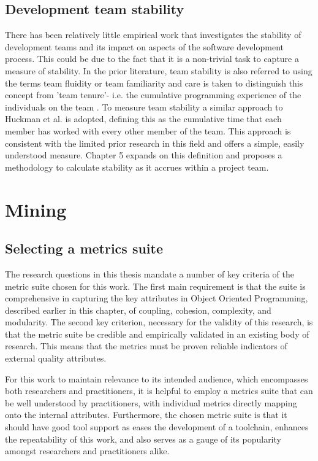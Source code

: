 \subsection{Development team stability}
There has been relatively little empirical work that investigates the stability of development teams and its impact on aspects of the software development process. This could be due to the fact that it is a non-trivial task to capture a measure of stability. In the prior literature, team stability is also referred to using the terms team fluidity or team familiarity \citep{huckman2009team} and care is taken to distinguish this concept from 'team tenure'- i.e. the cumulative programming experience of the individuals on the team \citep{hackman2002leading}. To measure team stability a similar approach to Huckman et al. \citep{huckman2009team} is adopted, defining this as the cumulative time that each member has worked with every other member of the team. This approach is consistent with the limited prior research in this field and offers a simple, easily understood measure. Chapter 5 expands on this definition and proposes a methodology to calculate stability as it accrues within a project team.
	
\section{Mining} %

\subsection{Selecting a metrics suite}
The research questions in this thesis mandate a number of key criteria of the metric suite chosen for this work. The first main requirement is that the suite is comprehensive in capturing the key attributes in Object Oriented Programming, described earlier in this chapter, of coupling, cohesion, complexity, and modularity. The second key criterion, necessary for the validity of this research, is that the metric suite be credible and empirically validated in an existing body of research. This means that the metrics must be proven reliable indicators of external quality attributes.

For this work to maintain relevance to its intended audience, which encompasses both researchers and practitioners, it is helpful to employ a metrics suite that can be well understood by practitioners, with individual metrics directly mapping onto the internal attributes. Furthermore, the chosen metric suite is that it should have good tool support as eases the development of a toolchain, enhances the repeatability of this work, and also serves as a gauge of its popularity amongst researchers and practitioners alike. 

